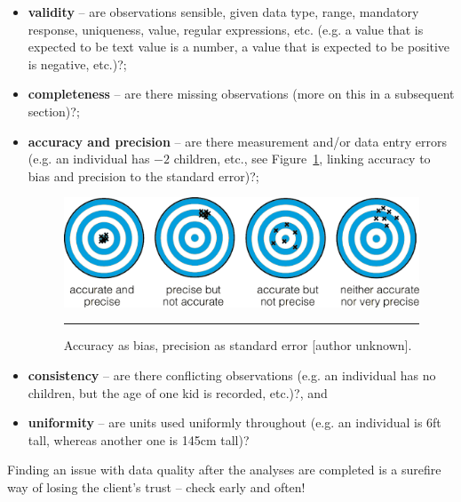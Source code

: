 \begin{itemize}[noitemsep]
\item \textbf{validity} -- are observations sensible, given data type, range, mandatory response, uniqueness, value, regular expressions, etc. (e.g. a value that is expected to be text value is a number, a value that is expected to be positive is negative, etc.)?; 
\item \textbf{completeness} -- are there missing observations (more on this in a subsequent section)?; 
\item \textbf{accuracy and precision} -- are there measurement and/or data entry errors (e.g. an individual has $-2$ children, etc., see  Figure~\ref{fig:targets}, linking accuracy to bias and precision to the standard error)?; \begin{figure}[t]
\centering
\includegraphics[width=\textwidth]{Images/targets.png}
\caption{\small Accuracy as bias, precision as standard error [author unknown].} \label{fig:targets}\hrule
\end{figure}
\afterpage{\FloatBarrier}
\item 
\textbf{consistency} -- are there conflicting observations (e.g. an individual has no children, but the age of one kid is recorded, etc.)?, and 
\item \textbf{uniformity} -- are units used uniformly throughout (e.g. an individual is 6ft tall, whereas another one is 145cm tall)?\end{itemize}
\newpage\noindent Finding an issue with data quality after the analyses are completed is a surefire way of losing the client's trust -- check early and often!
